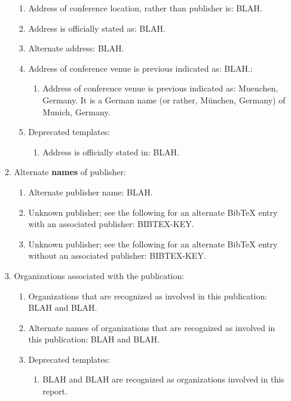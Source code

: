 \documentclass[letter,12pt]{article}
\begin{document}
\begin{enumerate}
\begin{enumerate}
\begin{enumerate}
		\item Address of conference location, rather than publisher is: BLAH.
		\item Address is officially stated as: BLAH.
		\item Alternate address: BLAH.
		\item Address of conference venue is previous indicated as: BLAH.: \vspace{-0.1cm}
			\begin{enumerate} \itemsep -1pt
			\item Address of conference venue is previous indicated as: Muenchen, Germany. It is a German name (or rather, M{\"{u}}nchen, Germany) of Munich, Germany.
			\end{enumerate}
		\item Deprecated templates: \vspace{-0.1cm}
			\begin{enumerate} \itemsep -1pt
			\item Address is officially stated in: BLAH.
			\end{enumerate}
		\end{enumerate}
	\item Alternate {\bf names} of publisher: \vspace{-0.2cm}
		\begin{enumerate} \itemsep -2pt
		\item Alternate publisher name: BLAH.
		\item Unknown publisher; see the following for an alternate BibTeX entry with an associated publisher: BIBTEX-KEY.
		\item Unknown publisher; see the following for an alternate BibTeX entry without an associated publisher: BIBTEX-KEY.
		\end{enumerate}
	\item Organizations associated with the publication: \vspace{-0.2cm}
		\begin{enumerate} \itemsep -2pt
		\item Organizations that are recognized as involved in this publication: BLAH and BLAH.
		\item Alternate names of organizations that are recognized as involved in this publication: BLAH and BLAH.
		\item Deprecated templates: \vspace{-0.1cm}
			\begin{enumerate} \itemsep -1pt
			\item BLAH and BLAH are recognized as organizations involved in this report.

\end{enumerate}
\end{enumerate}
\end{enumerate}
\end{enumerate}
\end{document}
